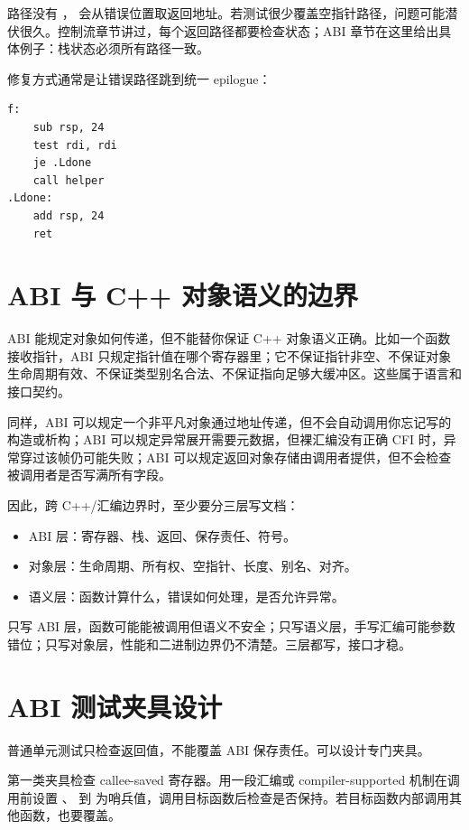  路径没有 ， 会从错误位置取返回地址。若测试很少覆盖空指针路径，问题可能潜伏很久。控制流章节讲过，每个返回路径都要检查状态；ABI 章节在这里给出具体例子：栈状态必须所有路径一致。

修复方式通常是让错误路径跳到统一 epilogue：

\begin{lstlisting}
f:
    sub rsp, 24
    test rdi, rdi
    je .Ldone
    call helper
.Ldone:
    add rsp, 24
    ret
\end{lstlisting}

\section{ABI 与 C++ 对象语义的边界}

ABI 能规定对象如何传递，但不能替你保证 C++ 对象语义正确。比如一个函数接收指针，ABI 只规定指针值在哪个寄存器里；它不保证指针非空、不保证对象生命周期有效、不保证类型别名合法、不保证指向足够大缓冲区。这些属于语言和接口契约。

同样，ABI 可以规定一个非平凡对象通过地址传递，但不会自动调用你忘记写的构造或析构；ABI 可以规定异常展开需要元数据，但裸汇编没有正确 CFI 时，异常穿过该帧仍可能失败；ABI 可以规定返回对象存储由调用者提供，但不会检查被调用者是否写满所有字段。

因此，跨 C++/汇编边界时，至少要分三层写文档：

\begin{itemize}
  \item ABI 层：寄存器、栈、返回、保存责任、符号。
  \item 对象层：生命周期、所有权、空指针、长度、别名、对齐。
  \item 语义层：函数计算什么，错误如何处理，是否允许异常。
\end{itemize}

只写 ABI 层，函数可能能被调用但语义不安全；只写语义层，手写汇编可能参数错位；只写对象层，性能和二进制边界仍不清楚。三层都写，接口才稳。

\section{ABI 测试夹具设计}

普通单元测试只检查返回值，不能覆盖 ABI 保存责任。可以设计专门夹具。

第一类夹具检查 callee-saved 寄存器。用一段汇编或 compiler-supported 机制在调用前设置 、 到  为哨兵值，调用目标函数后检查是否保持。若目标函数内部调用其他函数，也要覆盖。

